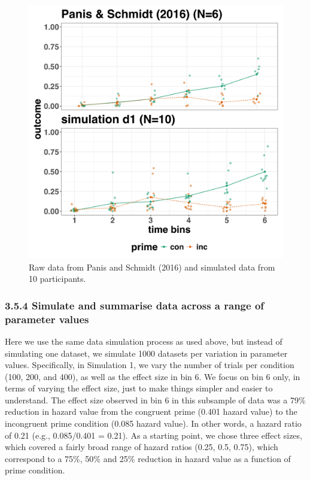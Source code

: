 \documentclass[
  man, donotrepeattitle,floatsintext]{apa6}
\begin{document}
\begin{figure}[H]

{\centering \includegraphics[width=0.8\linewidth,height=0.67\textheight,]{../Tutorial_4_Planning/figures/raw_vs_d1} 

}

\caption{Raw data from Panis and Schmidt (2016) and simulated data from 10 participants.}\label{fig:simdat}
\end{figure}

\subsubsection{3.5.4 Simulate and summarise data across a range of parameter values}\label{simulate-and-summarise-data-across-a-range-of-parameter-values}

Here we use the same data simulation process as used above, but instead of simulating one dataset, we simulate 1000 datasets per variation in parameter values.
Specifically, in Simulation 1, we vary the number of trials per condition (100, 200, and 400), as well as the effect size in bin 6.
We focus on bin 6 only, in terms of varying the effect size, just to make things simpler and easier to understand.
The effect size observed in bin 6 in this subsample of data was a 79\% reduction in hazard value from the congruent prime (0.401 hazard value) to the incongruent prime condition (0.085 hazard value). In other words, a hazard ratio of 0.21 (e.g., 0.085/0.401 = 0.21).
As a starting point, we chose three effect sizes, which covered a fairly broad range of hazard ratios (0.25, 0.5, 0.75), which correspond to a 75\%, 50\% and 25\% reduction in hazard value as a function of prime condition.
\end{document}
